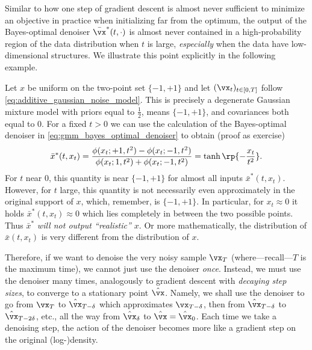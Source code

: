 \documentclass[../../book-main.tex]{subfiles}
\begin{document}
Similar to how one step of gradient descent is almost never sufficient to
minimize an objective in practice when initializing far from the optimum, the
output of the Bayes-optimal denoiser \(\bar{\vx}^{\ast}(t, \cdot)\) is almost never contained in a high-probability region of the data distribution when \(t\) is large, \textit{especially} when the data have low-dimensional structures. We illustrate this point explicitly in the following example.
\begin{example}\label{example:denoising_twopoints}
	Let \(x\) be uniform on the two-point set \(\{-1, +1\}\) and let \((\vx_{t})_{t \in [0, T]}\) follow \eqref{eq:additive_gaussian_noise_model}. This is precisely a degenerate Gaussian mixture model with priors equal to \(\frac{1}{2}\), means \(\{-1, +1\}\), and covariances both equal to \(0\). For a fixed \(t > 0\) we can use the calculation of the Bayes-optimal denoiser in \eqref{eq:gmm_bayes_optimal_denoiser} to obtain (proof as exercise)
	\begin{equation}
		\bar{x}^{\ast}(t, x_{t}) = \frac{\phi(x_{t} ; +1, t^{2}) - \phi(x_{t}
		; -1, t^{2})}{\phi(x_{t} ; 1, t^{2}) + \phi(x_{t} ; -1, t^{2})} = \tanh\rp{-\frac{x_{t}}{t^{2}}}.
	\end{equation}
	For \(t\) near \(0\), this quantity is near \(\{-1, +1\}\) for almost all inputs \(\bar{x}^{\ast}(t, x_{t})\). However, for \(t\) large, this quantity is not necessarily even approximately in the original support of \(x\), which, remember, is \(\{-1, +1\}\). In particular, for \(x_{t} \approx 0\) it holds \(\bar{x}^{\ast}(t, x_{t}) \approx 0\) which lies completely in between the two possible points. Thus \(\bar{x}^{\ast}\) \textit{will not output ``realistic'' \(x\)}. Or more mathematically, the distribution of \(\bar{x}(t, x_{t})\) is very different from the distribution of \(x\).
\end{example}

Therefore, if we want to denoise the very noisy sample \(\vx_{T}\) (where—recall—\(T\) is the maximum time), we cannot just use the denoiser \textit{once}. Instead, we must use the denoiser many times, analogously to gradient descent with \textit{decaying step sizes}, to converge to a stationary point \(\hat{\vx}\). Namely, we shall use the denoiser to go from \(\vx_{T}\) to \(\hat{\vx}_{T - \delta}\) which approximates \(\vx_{T - \delta}\), then from \(\hat{\vx}_{T - \delta}\) to \(\hat{\vx}_{T - 2\delta}\), etc., all the way from \(\hat{\vx}_{\delta}\) to \(\hat{\vx} = \hat{\vx}_{0}\). Each time we take a denoising step, the action of the denoiser becomes more like a gradient step on the original (log-)density. 
\end{document}
